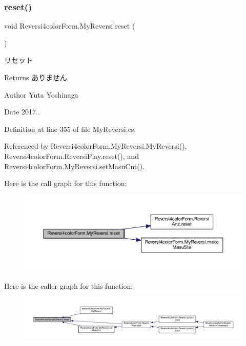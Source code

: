 \subsubsection{\texorpdfstring{reset()}{reset()}}
{\footnotesize\ttfamily void Reversi4color\+Form.\+My\+Reversi.\+reset (\begin{DoxyParamCaption}{ }\end{DoxyParamCaption})}



リセット 

\begin{DoxyReturn}{Returns}
ありません 
\end{DoxyReturn}
\begin{DoxyAuthor}{Author}
Yuta Yoshinaga 
\end{DoxyAuthor}
\begin{DoxyDate}{Date}
2017.. 
\end{DoxyDate}


Definition at line 355 of file My\+Reversi.\+cs.



Referenced by Reversi4color\+Form.\+My\+Reversi.\+My\+Reversi(), Reversi4color\+Form.\+Reversi\+Play.\+reset(), and Reversi4color\+Form.\+My\+Reversi.\+set\+Masu\+Cnt().

Here is the call graph for this function\+:
\nopagebreak
\begin{figure}[H]
\begin{center}
\leavevmode
\includegraphics[width=350pt]{class_reversi4color_form_1_1_my_reversi_aeb24b855c540f99c901de08b11af1dd6_cgraph}
\end{center}
\end{figure}
Here is the caller graph for this function\+:
\nopagebreak
\begin{figure}[H]
\begin{center}
\leavevmode
\includegraphics[width=350pt]{class_reversi4color_form_1_1_my_reversi_aeb24b855c540f99c901de08b11af1dd6_icgraph}
\end{center}
\end{figure}
\mbox{\label{class_reversi4color_form_1_1_my_reversi_a94536b8feaa37ca51b3d0612befae12f}} 
